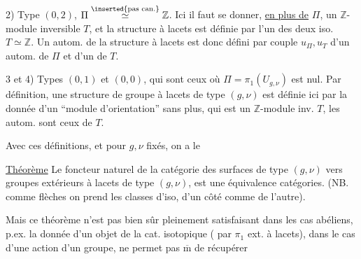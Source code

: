 2) Type $(0,2)$, $\Pi\overset{\inserted{\text{pas can.}}}{\simeq}\mathbb{Z}$. Ici il faut se donner, \uline{en plus de} $\Pi$, un $\mathbb{Z}$-module inversible $T$, et la structure à lacets est définie par l'un des deux iso. $T\simeq\mathbb{Z}$. Un autom. de la structure à lacets est donc défini par   couple $u_{\Pi},u_T$ d'un autom. de $\Pi$ et d'un de $T$.

3 et 4) Types $(0,1)$ et $(0,0)$, qui sont ceux où $\Pi=\pi_1(U_{g,\nu})$ est nul. Par définition, une structure de groupe à lacets de type $(g,\nu)$ est définie ici par la donnée d'un ``module d'orientation'' sans plus, qui est un $\mathbb{Z}$-module inv. $T$, les autom. sont ceux de $T$.

Avec ces définitions, et pour $g,\nu$ fixés, on a le

\uline{Théorème}  Le foncteur naturel de la catégorie  des surfaces de type $(g,\nu)$ vers   groupes extérieurs à lacets de type $(g,\nu)$, est une équivalence  catégories. (NB. comme flèches on prend les classes d'iso, d'un côté comme de l'autre).

Mais ce théorème n'est pas bien sûr pleinement satisfaisant dans les cas abéliens, p.ex. la donnée d'un objet de la cat. isotopique ( par  $\pi_1$ ext. à lacets), dans le cas d'une action d'un groupe, ne permet pas $\overline{\mathrm m}$ de récupérer

